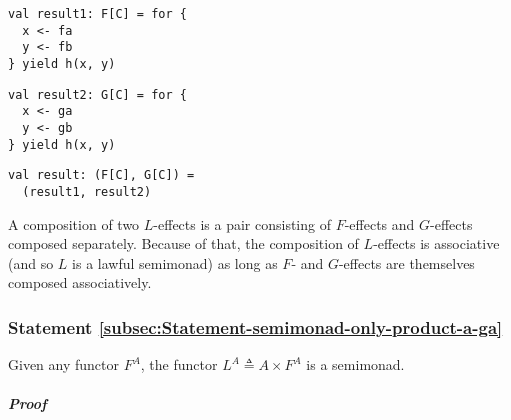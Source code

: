 \begin{center}
\begin{minipage}[t]{0.3\columnwidth}%
\begin{lstlisting}
val result1: F[C] = for {
  x <- fa
  y <- fb
} yield h(x, y)
\end{lstlisting}
%
\end{minipage}\hfill{} %
\begin{minipage}[t]{0.3\columnwidth}%
\begin{lstlisting}
val result2: G[C] = for {
  x <- ga
  y <- gb
} yield h(x, y)
\end{lstlisting}
%
\end{minipage}\hfill{} %
\begin{minipage}[t]{0.3\columnwidth}%
\begin{lstlisting}
val result: (F[C], G[C]) =
  (result1, result2)
\end{lstlisting}
%
\end{minipage}\vspace{-0.35\baselineskip}
\par\end{center}

A composition of two $L$-effects is a pair consisting of $F$-effects
and $G$-effects composed separately. Because of that, the composition
of $L$-effects is associative (and so $L$ is a lawful semimonad)
as long as $F$- and $G$-effects are themselves composed associatively.

\subsubsection{Statement \label{subsec:Statement-semimonad-only-product-a-ga}\ref{subsec:Statement-semimonad-only-product-a-ga}}

Given any functor $F^{A}$, the functor $L^{A}\triangleq A\times F^{A}$
is a semimonad.

\subparagraph{Proof}

